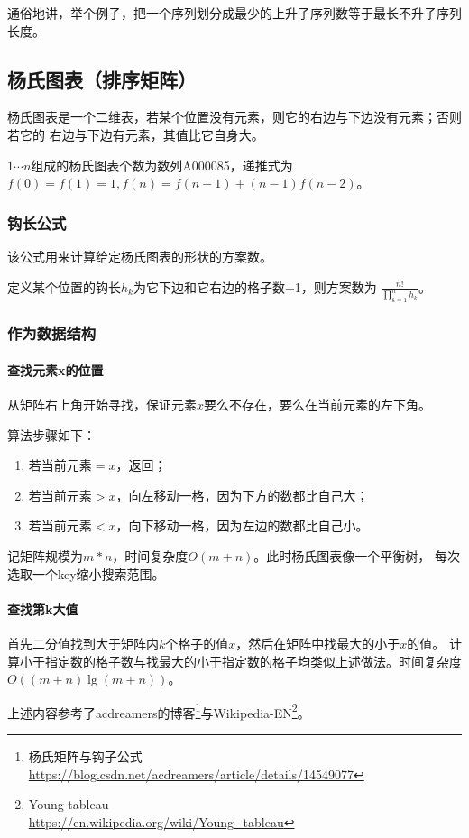 通俗地讲，举个例子，把一个序列划分成最少的上升子序列数等于最长不升子序列长度。
\subsection{杨氏图表（排序矩阵）}
杨氏图表是一个二维表，若某个位置没有元素，则它的右边与下边没有元素；否则若它的
右边与下边有元素，其值比它自身大。

$1\cdots n$组成的杨氏图表个数为数列A000085，递推式为
$f(0)=f(1)=1,f(n)=f(n-1)+(n-1)f(n-2)$。

\subsubsection{钩长公式}
该公式用来计算给定杨氏图表的形状的方案数。

定义某个位置的钩长$h_k$为它下边和它右边的格子数+1，则方案数为
$\frac{n!}{\displaystyle \prod_{k=1}^n{h_k}}$。
\subsubsection{作为数据结构}
\paragraph{查找元素x的位置}
从矩阵右上角开始寻找，保证元素$x$要么不存在，要么在当前元素的左下角。

算法步骤如下：
\begin{enumerate}
    \item 若当前元素$=x$，返回；
    \item 若当前元素$>x$，向左移动一格，因为下方的数都比自己大；
    \item 若当前元素$<x$，向下移动一格，因为左边的数都比自己小。
\end{enumerate}

记矩阵规模为$m*n$，时间复杂度$O(m+n)$。此时杨氏图表像一个平衡树，
每次选取一个key缩小搜索范围。
\paragraph{查找第k大值}
首先二分值找到大于矩阵内$k$个格子的值$x$，然后在矩阵中找最大的小于$x$的值。
计算小于指定数的格子数与找最大的小于指定数的格子均类似上述做法。时间复杂度
$O((m+n)\lg (m+n))$。

上述内容参考了acdreamers的博客\footnote{
    杨氏矩阵与钩子公式\\
    \url{https://blog.csdn.net/acdreamers/article/details/14549077}
}与Wikipedia-EN\footnote{
    Young tableau\\
    \url{https://en.wikipedia.org/wiki/Young\_tableau}
}。
